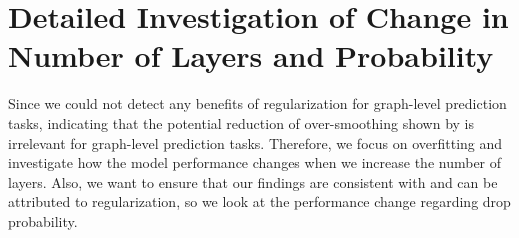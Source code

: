 \newcommand*{\addstd}[4]{
    \addplot[name path=#3upper, draw=none] table[x=#2, y expr=\thisrow{#3Avg}+\thisrow{#3Std}, col sep=semicolon] {#1};
    \addplot[name path=#3lower, draw=none] table[x=#2, y expr=\thisrow{#3Avg}-\thisrow{#3Std}, col sep=semicolon] {#1};
    \addplot[fill=#4, fill opacity=0.1] fill between[of=#3upper and #3lower];
}
\newcommand*{\layerplot}[6]{\begin{tikzpicture}
        \begin{axis}[
                width=0.8\linewidth,
                height=6cm,
                xlabel={#3},
                ylabel={#4},
                xtick={#5}, %
                ytick distance={#6}, %
                legend pos=outer north east,
                legend style={nodes={scale=0.6, transform shape}},
                grid=major,
            ]

            \addplot[color= p_red] table [x=#2, y=noneAvg, col sep=semicolon] {#1};
            \addlegendentry{No Regularization}

            \addplot[color= p_green] table [x=#2, y=dropoutAvg, col sep=semicolon] {#1};
            \addlegendentry{Dropout}

            \addplot[color= p_blue] table [x=#2, y=nodesamplingAvg, col sep=semicolon] {#1};
            \addlegendentry{Node Sampling}

            \addplot[color= p_yellow] table [x=#2, y=dropedgeAvg, col sep=semicolon] {#1};
            \addlegendentry{DropEdge}

            \addplot[color= p_violet] table [x=#2, y=gdcAvg, col sep=semicolon] {#1};
            \addlegendentry{GDC}

            \addstd{#1}{#2}{none}{p_red}
            \addstd{#1}{#2}{dropout}{p_green}
            \addstd{#1}{#2}{nodesampling}{p_blue}
            \addstd{#1}{#2}{dropedge}{p_yellow}
            \addstd{#1}{#2}{gdc}{p_violet}
        \end{axis}
    \end{tikzpicture}}


\section{Detailed Investigation of Change in Number of Layers and Probability}
Since we could not detect any benefits of regularization for graph-level prediction tasks, indicating that the potential reduction of over-smoothing shown by \citep{Hasanzadeh2020} is irrelevant for graph-level prediction tasks.
Therefore, we focus on overfitting and investigate how the model performance changes when we increase the number of layers.
Also, we want to ensure that our findings are consistent with and can be attributed to regularization, so we look at the performance change regarding drop probability.

